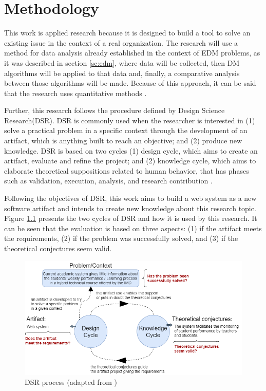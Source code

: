 \chapter{Methodology}
\label{ch:Methodology}

This work is applied research because it is designed to build a tool to solve an existing issue in the context of a real organization. The research will use a method for data analysis already established in the context of EDM problems, as it was described in section \ref{sc:edm}, where data will be collected, then DM algorithms will be applied to that data and, finally, a comparative analysis between those algorithms will be made. Because of this approach, it can be said that the research uses quantitative methods \cite{gomes2019classificaccao}.

Further, this research follows the procedure defined by Design Science Research(DSR). DSR is commonly used when the researcher is interested in (1) solve a practical problem in a specific context through the development of an artifact, which is anything built to reach an objective; and (2) produce new knowledge. DSR is based on two cycles (1) design cycle, which aims to create an artifact, evaluate and refine the project; and (2) knowledge cycle, which aims to elaborate theoretical suppositions related to human behavior, that has phases such as validation, execution, analysis, and research contribution \cite{pimentel2019design}.

Following the objectives of DSR, this work aims to build a web system as a new software artifact and intends to create new knowledge about this research topic. Figure \ref{fig:dsr} presents the two cycles of DSR and how it is used by this research. It can be seen that the evaluation is based on three aspects: (1) if the artifact meets the requirements, (2) if the problem was successfully solved, and (3) if the theoretical conjectures seem valid.

\begin{figure}[htb]
	\centering
  	\includegraphics[scale=.55]{Imagens/dsr.png}
  	\caption{DSR process (adapted from \cite{pimentel2019design})}
  	\label{fig:dsr}
\end{figure}

